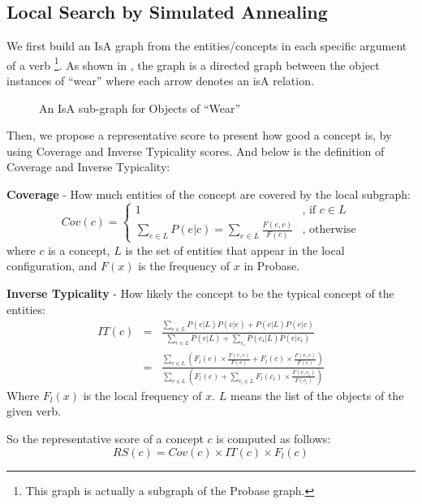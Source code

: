 \subsection{Local Search by Simulated Annealing}
\label{sec:algo_ls}

We first build an IsA graph from the entities/concepts in each specific argument of a verb \footnote{This graph is actually a subgraph of the
Probase graph.}. As shown in , the graph is
a directed graph between the object instances of ``wear'' where each
arrow denotes an isA relation.
\begin{figure}[th]
\centering
{}
\caption{An IsA sub-graph for Objects of ``Wear''}
\label{fig:subgraph}
\end{figure}

Then, we propose a representative score to present how good a concept
is, by using Coverage and Inverse Typicality scores.
And below is the definition of  Coverage and Inverse Typicality:

\textbf{Coverage} - How much entities of the concept are covered by the local subgraph:
\begin{equation}
Cov(c) = \left\{ \begin{array}{ll}
1 & \textrm{, if $c \in L$}\\
\sum\limits_{e\in L}{P(e|c)=\sum\limits_{e\in L}{\frac{F(e,c)}{F(c)}}}& \textrm{, otherwise}
\end{array} \right.
\end{equation}
where $c$ is a concept, $L$ is the set of entities that appear in the local configuration, and $F(x)$ is the frequency of $x$ in Probase.

\textbf{Inverse Typicality} - How likely the concept to be the typical concept of the entities:
\begin{eqnarray}
IT(c)
&=& \frac{\sum_{e\in L}{P(e|L)P(c|e)+P(c|L)P(e|c)}}{\sum_{e\in L}{P(e|L)+\sum_{e_i}{P(c_i|L)P(e|c_i)}}} \nonumber\\
&=& \frac{\sum_{e\in L}{(F_l(e)\times \frac{F(e,c)}{F(e)}+F_l(c)\times \frac{F(e,c)}{F(c)})}}{\sum_{e\in L}{(F_l(e)+\sum_{c_i\in L}{F_l(c_i)\times \frac{F(e,c_i)}{F(c_i)}})}}
\end{eqnarray}
Where $F_l(x)$ is the local frequency of $x$. $L$ means the list of the objects of the given verb.

So the representative score of a concept $c$ is computed as follows:
\begin{equation}
RS(c) = Cov(c) \times IT(c)\times F_l(c)
\end{equation}

